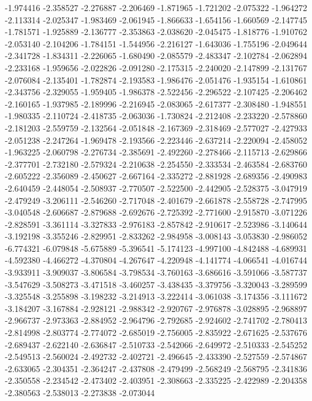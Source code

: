 -1.974416
-2.358527
-2.276887
-2.206469
-1.871965
-1.721202
-2.075322
-1.964272
-2.113314
-2.025347
-1.983469
-2.061945
-1.866633
-1.654156
-1.660569
-2.147745
-1.781571
-1.925889
-2.136777
-2.353863
-2.038620
-2.045475
-1.818776
-1.910762
-2.053140
-2.104206
-1.784151
-1.544956
-2.216127
-1.643036
-1.755196
-2.049644
-2.341728
-1.834311
-2.226065
-1.680490
-2.085579
-2.483347
-2.102784
-2.062894
-2.233168
-1.959656
-2.022826
-2.091280
-2.175315
-2.240020
-2.147899
-2.131767
-2.076084
-2.135401
-1.782874
-2.193583
-1.986476
-2.051476
-1.935154
-1.610861
-2.343756
-2.329055
-1.959405
-1.986378
-2.522456
-2.296522
-2.107425
-2.206462
-2.160165
-1.937985
-2.189996
-2.216945
-2.083065
-2.617377
-2.308480
-1.948551
-1.980335
-2.110724
-2.418735
-2.063036
-1.730824
-2.212408
-2.233220
-2.578860
-2.181203
-2.559759
-2.132564
-2.051848
-2.167369
-2.318469
-2.577027
-2.427933
-2.051238
-2.247264
-1.969478
-2.193566
-2.223446
-2.637214
-2.220094
-2.458052
-1.963225
-2.060798
-2.276734
-2.385691
-2.492260
-2.278466
-2.115713
-2.629866
-2.377701
-2.732180
-2.579324
-2.210638
-2.254550
-2.333534
-2.463584
-2.683760
-2.605222
-2.356089
-2.450627
-2.667164
-2.335272
-2.881928
-2.689356
-2.490983
-2.640459
-2.448054
-2.508937
-2.770507
-2.522500
-2.442905
-2.528375
-3.047919
-2.479249
-3.206111
-2.546260
-2.717048
-2.401679
-2.661878
-2.558728
-2.747995
-3.040548
-2.606687
-2.879688
-2.692676
-2.725392
-2.771600
-2.915870
-3.071226
-2.828591
-3.361114
-3.327833
-2.976183
-2.857842
-2.910617
-2.523986
-3.140644
-3.192198
-3.355246
-2.829951
-2.833262
-2.984958
-3.008143
-3.053830
-2.986052
-6.774321
-6.079848
-5.675889
-5.396541
-5.174123
-4.997100
-4.842488
-4.689931
-4.592380
-4.466272
-4.370804
-4.267647
-4.220948
-4.141774
-4.066541
-4.016744
-3.933911
-3.909037
-3.806584
-3.798534
-3.760163
-3.686616
-3.591066
-3.587737
-3.547629
-3.508273
-3.471518
-3.460257
-3.438435
-3.379756
-3.320043
-3.289599
-3.325548
-3.255898
-3.198232
-3.214913
-3.222414
-3.061038
-3.174356
-3.111672
-3.184207
-3.167884
-2.928121
-2.988342
-2.920767
-2.976878
-3.028895
-2.968897
-2.966737
-2.973363
-2.884952
-2.964796
-2.792685
-2.924602
-2.741702
-2.780413
-2.814998
-2.803774
-2.774072
-2.685019
-2.756005
-2.835922
-2.671625
-2.537676
-2.689437
-2.622140
-2.636847
-2.510733
-2.542066
-2.649972
-2.510333
-2.545252
-2.549513
-2.560024
-2.492732
-2.402721
-2.496645
-2.433390
-2.527559
-2.574867
-2.633065
-2.304351
-2.364247
-2.437808
-2.479499
-2.568249
-2.568795
-2.341836
-2.350558
-2.234542
-2.473402
-2.403951
-2.308663
-2.335225
-2.422989
-2.204358
-2.380563
-2.538013
-2.273838
-2.073044
